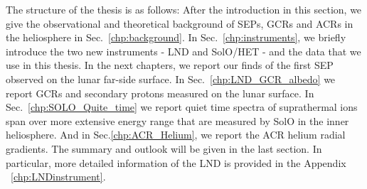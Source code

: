 The structure of the thesis is as follows: After the introduction in this section, we give the observational and theoretical background of \acp{SEP}, \acp{GCR} and \acp{ACR} in the heliosphere in Sec.~\ref{chp:background}. In Sec.~\ref{chp:instruments}, we briefly introduce the two new instruments - \ac{LND} and \ac{SolO}/\ac{HET} - and the data that we use in this thesis. In the next chapters, we report our finds of the first \ac{SEP} observed on the lunar far-side surface. In Sec.~\ref{chp:LND_GCR_albedo} we report \acp{GCR} and secondary protons measured on the lunar surface. In Sec.~\ref{chp:SOLO_Quite_time} we report quiet time spectra of suprathermal ions span over more extensive energy range that are measured by \ac{SolO} in the inner heliosphere. And in Sec.\ref{chp:ACR_Helium}, we report the \ac{ACR} helium radial gradients. The summary and outlook will be given in the last section.
In particular, more detailed information of the \ac{LND} is provided in the Appendix ~\ref{chp:LNDinstrument}.


















